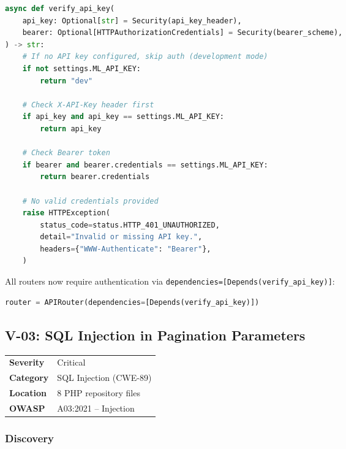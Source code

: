 \documentclass[12pt,a4paper]{article}
\begin{document}
\begin{lstlisting}[language=Python, caption={app/middleware/auth.py -- API key verification}]
async def verify_api_key(
    api_key: Optional[str] = Security(api_key_header),
    bearer: Optional[HTTPAuthorizationCredentials] = Security(bearer_scheme),
) -> str:
    # If no API key configured, skip auth (development mode)
    if not settings.ML_API_KEY:
        return "dev"
    
    # Check X-API-Key header first
    if api_key and api_key == settings.ML_API_KEY:
        return api_key
    
    # Check Bearer token
    if bearer and bearer.credentials == settings.ML_API_KEY:
        return bearer.credentials
    
    # No valid credentials provided
    raise HTTPException(
        status_code=status.HTTP_401_UNAUTHORIZED,
        detail="Invalid or missing API key.",
        headers={"WWW-Authenticate": "Bearer"},
    )
\end{lstlisting}

All routers now require authentication via \texttt{dependencies=[Depends(verify\_api\_key)]}:

\begin{lstlisting}[language=Python, caption={Route-level authentication enforcement}]
router = APIRouter(dependencies=[Depends(verify_api_key)])
\end{lstlisting}

\subsection{V-03: SQL Injection in Pagination Parameters}

\begin{table}[H]
\centering
\begin{tabularx}{\textwidth}{lX}
\toprule
\textbf{Severity} & \textcolor{critical}{Critical} \\
\textbf{Category} & SQL Injection (CWE-89) \\
\textbf{Location} & 8 PHP repository files \\
\textbf{OWASP} & A03:2021 -- Injection \\
\bottomrule
\end{tabularx}
\end{table}

\subsubsection{Discovery}
\end{document}
